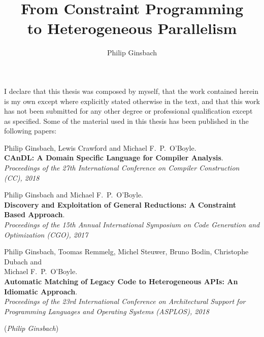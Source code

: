 \documentclass[phd,icsa,twoside,logo,11pt]{infthesis}
\title{From Constraint Programming\\to Heterogeneous Parallelism}
\author{Philip Ginsbach}
\begin{document}
\begin{preliminary}
\maketitle
\begin{acknowledgements}

\end{acknowledgements}
\begin{declaration}
    I declare that this thesis was composed by myself, that the work contained
    herein is my own except where explicitly stated otherwise in the text, and
    that this work has not been submitted for any other degree or professional
    qualification except as specified.
    Some of the material used in this thesis has been published in the following
    papers:

    \begin{description}
    \small
        \item[\hspace{0.35cm}\citep{Ginsbach:2018:CDS:3178372.3179515}]
              Philip Ginsbach, Lewis Crawford and Michael F.\ P.\ O'Boyle.\\
              {\bf CAnDL: A Domain Specific Language for Compiler Analysis}.\\
              {\em Proceedings of the 27th International Conference on
               Compiler Construction (CC), 2018}
        \item[\hspace{0.35cm}\citep{ginsbach2017discovery}]
              Philip Ginsbach and Michael F.\ P.\ O'Boyle.\\
              {\bf Discovery and Exploitation of General Reductions: A
              Constraint Based Approach}.\\
              {\em Proceedings of the 15th Annual International
               Symposium on Code Generation and\\Optimization (CGO), 2017}
        \item[\hspace{0.35cm}\citep{Ginsbach:2018:AML:3173162.3173182}]
              Philip Ginsbach, Toomas Remmelg, Michel Steuwer, Bruno Bodin,
              Christophe Dubach and\\Michael F.\ P.\ O'Boyle.\\
              {\bf Automatic Matching of Legacy Code to Heterogeneous APIs: An
              Idiomatic Approach}.\\
              {\em Proceedings of the 23rd International Conference on
               Architectural Support for\\Programming Languages and Operating
               Systems (ASPLOS), 2018}
    \end{description}

    \par
\vspace{1in}\raggedleft({\em Philip Ginsbach})
\end{declaration}
\tableofcontents
\end{preliminary}
\end{document}
